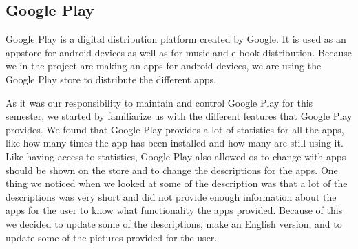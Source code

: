 \subsection{Google Play}
Google Play is a digital distribution platform created by Google. It is used as an appstore for android devices as well as for music and e-book distribution. Because we in the project are making an apps for android devices, we are using the Google Play store to distribute the different apps. 

As it was our responsibility to maintain and control Google Play for this semester, we started by familiarize us with the different features that Google Play provides. We found that Google Play provides a lot of statistics for all the apps, like how many times the app has been installed and how many are still using it. Like having access to statistics, Google Play also allowed os to change with apps should be shown on the store and to change the descriptions for the apps. One thing we noticed when we looked at some of the description was that a lot of the descriptions was very short and did not provide enough information about the apps for the user to know what functionality the apps provided. Because of this we decided to update some of the descriptions, make an English version, and to update some of the pictures provided for the user.


